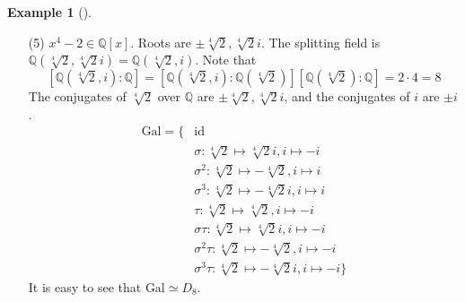 \documentclass{article}
\theoremstyle{definition}
\newtheorem{ex}{Example}
\newenvironment{exs}[1][]{%
  \begin{ex}[#1]$ $\par\nobreak\ignorespaces
}{%
  \end{ex}
}
\newcommand{\QQ}{\mathbb Q}
\begin{document}
\begin{exs}
\begin{enumerate}
			\item[(5)] $x^4 - 2 \in \QQ[x]$.
				Roots are $\pm \sqrt[4]{2}, \sqrt[4]{2} i$.
				The splitting field is $\QQ(\sqrt[4]{2}, \sqrt[4]{2} i) = \QQ(\sqrt[4]{2}, i)$.
				Note that 
				\[
					[\QQ(\sqrt[4]{2}, i):\QQ] = [\QQ(\sqrt[4]{2}, i):\QQ(\sqrt[4]{2})][\QQ(\sqrt[4]{2}):\QQ] = 2 \cdot 4 = 8
				\]
				The conjugates of $\sqrt[4]{2}$ over $\QQ$ are $\pm \sqrt[4]{2}, \sqrt[4]{2} i$, and the conjugates of $i$ are $\pm i$.
				\[
					\begin{split}
						\text{Gal} = \{&\text{id}\\
						&\sigma: \sqrt[4]{2} \mapsto \sqrt[4]{2} i, i \mapsto -i\\
						&\sigma^2: \sqrt[4]{2} \mapsto -\sqrt[4]{2}, i \mapsto i\\
						&\sigma^3: \sqrt[4]{2} \mapsto -\sqrt[4]{2} i, i \mapsto i\\
						&\tau: \sqrt[4]{2} \mapsto \sqrt[4]{2}, i \mapsto -i\\
						&\sigma \tau: \sqrt[4]{2} \mapsto \sqrt[4]{2} i, i \mapsto -i\\
						&\sigma^2 \tau: \sqrt[4]{2} \mapsto - \sqrt[4]{2}, i \mapsto -i\\
						&\sigma^3 \tau: \sqrt[4]{2} \mapsto -\sqrt[4]{2} i, i \mapsto -i\}
					\end{split}
				\]
				It is easy to see that $\text{Gal} \simeq D_8$.
	\end{enumerate}
\end{exs}
\end{document}

